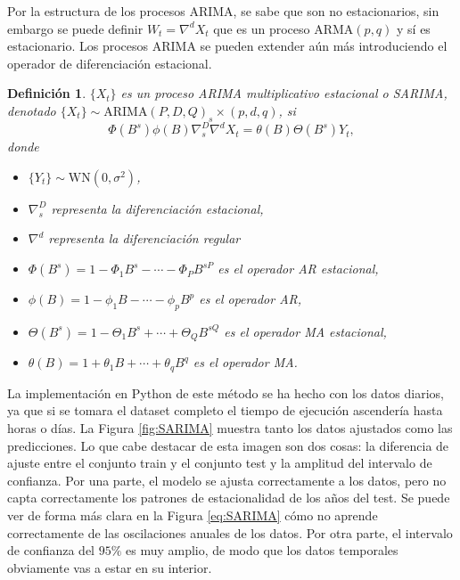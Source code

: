 \documentclass[12pt,twoside]{article}
\newtheorem{definition}[theorem]{Definición}
\newcommand{\arma}{\text{ARMA}}
\newcommand{\arima}{\text{ARIMA}}
\newcommand{\wn}{\text{WN}(0, \sigma^2)}
\begin{document}
Por la estructura de los procesos ARIMA, se sabe que son no estacionarios, sin embargo se puede definir $W_t = \nabla^d X_t$ que es un proceso $\arma(p,q)$ y sí es estacionario. Los procesos ARIMA se pueden extender aún más introduciendo el operador de diferenciación estacional.

\begin{definition}
    $\{X_t\}$ es un proceso ARIMA multiplicativo estacional o SARIMA, denotado $\{X_t\} \sim \arima(P,D,Q)_s\times (p,d,q)$, si
    \begin{equation}\label{eq:SARIMA}
        \Phi(B^s)\phi(B) \nabla_s^D \nabla^d X_t = \theta(B) \Theta(B^s) Y_t,
    \end{equation}
    donde
    \begin{itemize}
        \item $\{Y_t\} \sim \wn$,
        \item $\nabla_s^D$ representa la diferenciación estacional,
        \item $\nabla^d$ representa la diferenciación regular
        \item $\Phi(B^s) = 1 - \Phi_1B^s - \dotsb - \Phi_PB^{sP}$ es el operador AR estacional,
        \item $\phi(B) = 1 - \phi_1B - \dotsb - \phi_pB^p$ es el operador AR,
        \item $\Theta(B^s) = 1 - \Theta_1B^s + \dotsb + \Theta_QB^{sQ}$ es el operador MA estacional,
        \item $\theta(B) = 1 + \theta_1B + \dotsb + \theta_qB^q$ es el operador MA.
    \end{itemize}
\end{definition}

La implementación en Python de este método se ha hecho con los datos diarios, ya que si se tomara el dataset completo el tiempo de ejecución ascendería hasta horas o días. La Figura \ref{fig:SARIMA} muestra tanto los datos ajustados como las predicciones. Lo que cabe destacar de esta imagen son dos cosas: la diferencia de ajuste entre el conjunto train y el conjunto test y la amplitud del intervalo de confianza. Por una parte, el modelo se ajusta correctamente a los datos, pero no capta correctamente los patrones de estacionalidad de los años del test. Se puede ver de forma más clara en la Figura \ref{eq:SARIMA} cómo no aprende correctamente de las oscilaciones anuales de los datos. Por otra parte, el intervalo de confianza del $95\%$ es muy amplio, de modo que los datos temporales obviamente vas a estar en su interior. 
\end{document}
